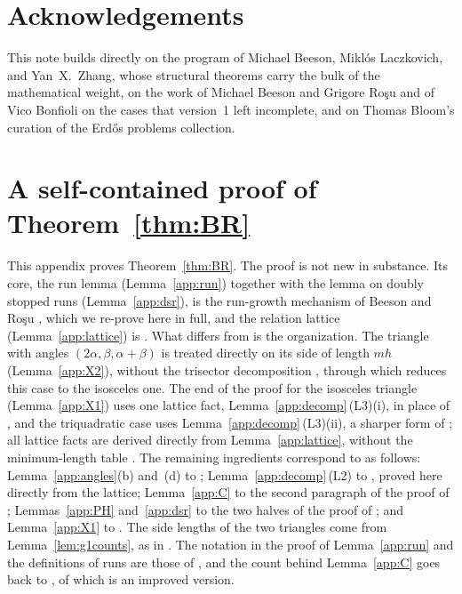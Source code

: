 \documentclass[11pt]{amsart}
\theoremstyle{remark}
\begin{document}
\section*{Acknowledgements}

This note builds directly on the program of Michael Beeson, Mikl\'os Laczkovich, and Yan~X.~Zhang, whose structural theorems carry the bulk of the mathematical weight, on the work of Michael Beeson and Grigore Ro\c{s}u and of Vico Bonfioli on the cases that version~1 left incomplete, and on Thomas Bloom's curation of the Erd\H{o}s problems collection.

\appendix

\section{A self-contained proof of Theorem~\ref{thm:BR}}\label{app:BR}

This appendix proves Theorem~\ref{thm:BR}. The proof is not new in substance. Its core, the run lemma (Lemma~\ref{app:run}) together with the lemma on doubly stopped runs (Lemma~\ref{app:dsr}), is the run-growth mechanism of Beeson and Ro\c{s}u \cite[Lemmas~32--34]{BR}, which we re-prove here in full, and the relation lattice (Lemma~\ref{app:lattice}) is \cite[Lemma~28]{BR}. What differs from \cite{BR} is the organization. The triangle with angles $(2\alpha,\beta,\alpha+\beta)$ is treated directly on its side of length $mh$ (Lemma~\ref{app:X2}), without the trisector decomposition \cite[Lemma~40]{BR}, through which \cite[Theorem~41]{BR} reduces this case to the isosceles one. The end of the proof for the isosceles triangle (Lemma~\ref{app:X1}) uses one lattice fact, Lemma~\ref{app:decomp}\,(L3)(i), in place of \cite[Lemma~30\,(D)]{BR}, and the triquadratic case uses Lemma~\ref{app:decomp}\,(L3)(ii), a sharper form of \cite[Lemma~30\,(E)]{BR}; all lattice facts are derived directly from Lemma~\ref{app:lattice}, without the minimum-length table \cite[Theorem~29]{BR}. The remaining ingredients correspond to \cite{BR} as follows: Lemma~\ref{app:angles}(b) and~(d) to \cite[Lemmas~23 and~24]{BR}; Lemma~\ref{app:decomp}\,(L2) to \cite[Lemma~30\,(A)--(C)]{BR}, proved here directly from the lattice; Lemma~\ref{app:C} to the second paragraph of the proof of \cite[Lemma~31]{BR}; Lemmas~\ref{app:PH} and~\ref{app:dsr} to the two halves of the proof of \cite[Lemma~34]{BR}; and Lemma~\ref{app:X1} to \cite[Lemma~36 and Theorem~37]{BR}. The side lengths of the two triangles come from Lemma~\ref{lem:g1counts}, as in \cite[Lemmas~35 and~39]{BR}. The notation in the proof of Lemma~\ref{app:run} and the definitions of runs are those of \cite[Section~11]{BR}, and the count behind Lemma~\ref{app:C} goes back to \cite[Lemma~8]{Beeson2229}, of which \cite[Lemma~31]{BR} is an improved version.
\end{document}
